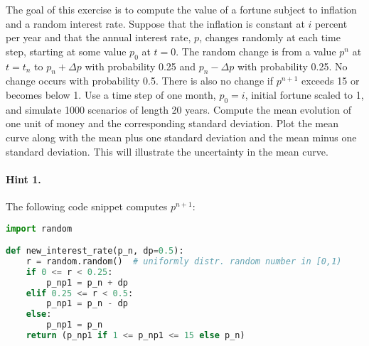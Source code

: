 \documentclass[graybox,sectrefs,envcountresetchap,open=right,final]{svmonodo}
\makeatletter
\newenvironment{doconceexercise}{}{}
\newcounter{doconceexercisecounter}%
\newcommand\listofexercises{
\chapter*{List of Exercises, Problems, and Projects
          \@mkboth{List of Exercises, Problems, and Projects}{List of Exercises, Problems, and Projects}}
\markboth{List of Exercises, Problems, and Projects}{List of Exercises, Problems, and Projects}
\@starttoc{loe}
}
\makeatother
\begin{document}
\begin{doconceexercise}

                
\label{decay:app:exer:interest}

The goal of this exercise is to compute the value of a fortune subject
to inflation and a random interest rate.
Suppose that the inflation is constant at $i$ percent per year and that the
annual interest rate, $p$, changes randomly at each time step,
starting at some value $p_0$ at $t=0$.
The random change is from a value $p^n$ at $t=t_n$ to
$p_n +\Delta p$ with probability 0.25 and $p_n -\Delta p$ with probability 0.25.
No change occurs with probability 0.5. There is also no change if
$p^{n+1}$ exceeds 15 or becomes below 1.
Use a time step of one month, $p_0=i$, initial fortune scaled to 1,
and simulate 1000 scenarios of
length 20 years. Compute the mean evolution of one unit of money and the
corresponding
standard deviation. Plot the mean curve along with the mean plus one
standard deviation and the mean minus one standard deviation. This will
illustrate the uncertainty in the mean curve.


\paragraph{Hint 1.}
The following code snippet computes $p^{n+1}$:












\begin{lstlisting}[language=python,style=blue1_bluegreen]
import random

def new_interest_rate(p_n, dp=0.5):
    r = random.random()  # uniformly distr. random number in [0,1)
    if 0 <= r < 0.25:
        p_np1 = p_n + dp
    elif 0.25 <= r < 0.5:
        p_np1 = p_n - dp
    else:
        p_np1 = p_n
    return (p_np1 if 1 <= p_np1 <= 15 else p_n)

\end{lstlisting}



\end{doconceexercise}
\end{document}
